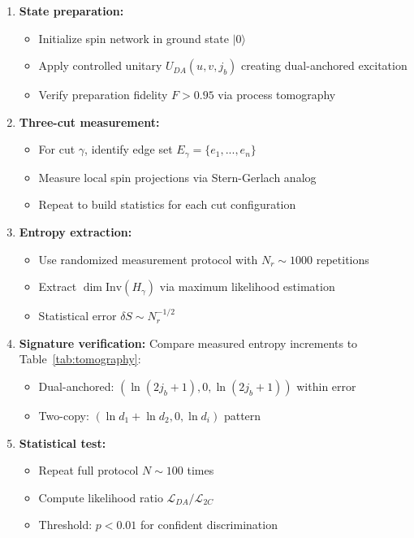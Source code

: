 \documentclass[11pt]{article}
\newcommand{\Inv}{\mathrm{Inv}}
\theoremstyle{plain}
\theoremstyle{definition}
\begin{document}
\begin{enumerate}
  \item \textbf{State preparation:}
    \begin{itemize}
      \item Initialize spin network in ground state $|0\rangle$
      \item Apply controlled unitary $U_{DA}(u,v,j_b)$ creating dual-anchored excitation
      \item Verify preparation fidelity $F > 0.95$ via process tomography
    \end{itemize}

  \item \textbf{Three-cut measurement:}
    \begin{itemize}
      \item For cut $\gamma$, identify edge set $E_\gamma = \{e_1, ..., e_n\}$
      \item Measure local spin projections via Stern-Gerlach analog
      \item Repeat to build statistics for each cut configuration
    \end{itemize}

  \item \textbf{Entropy extraction:}
    \begin{itemize}
      \item Use randomized measurement protocol with $N_r \sim 1000$ repetitions
      \item Extract $\dim\Inv(H_\gamma)$ via maximum likelihood estimation
      \item Statistical error $\delta S \sim N_r^{-1/2}$
    \end{itemize}

  \item \textbf{Signature verification:}
    Compare measured entropy increments to Table~\ref{tab:tomography}:
    \begin{itemize}
      \item Dual-anchored: $(\ln(2j_b+1), 0, \ln(2j_b+1))$ within error
      \item Two-copy: $(\ln d_1 + \ln d_2, 0, \ln d_i)$ pattern
    \end{itemize}

  \item \textbf{Statistical test:}
    \begin{itemize}
      \item Repeat full protocol $N \sim 100$ times
      \item Compute likelihood ratio $\mathcal{L}_{DA}/\mathcal{L}_{2C}$
      \item Threshold: $p < 0.01$ for confident discrimination
    \end{itemize}
\end{enumerate}
\end{document}

